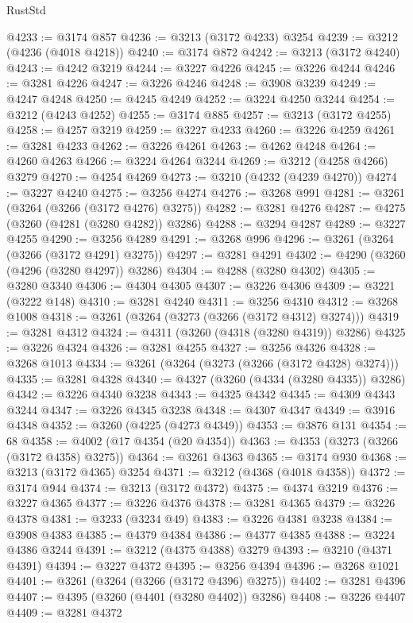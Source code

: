 \begin{lexlean}{RustStd}
\begin{coremodule}
{\begin{coremodule}
{{{{{{{{{{{{{{{{{{{{{{{{{{@4233 := @3174 @857
@4236 := @3213 (@3172 @4233) @3254
@4239 := @3212 (@4236 (@4018 @4218))
@4240 := @3174 @872
@4242 := @3213 (@3172 @4240)
@4243 := @4242 @3219
@4244 := @3227 @4226
@4245 := @3226 @4244
@4246 := @3281 @4226
@4247 := @3226 @4246
@4248 := @3908 @3239
@4249 := @4247 @4248
@4250 := @4245 @4249
@4252 := @3224 @4250 @3244
@4254 := @3212 (@4243 @4252)
@4255 := @3174 @885
@4257 := @3213 (@3172 @4255)
@4258 := @4257 @3219
@4259 := @3227 @4233
@4260 := @3226 @4259
@4261 := @3281 @4233
@4262 := @3226 @4261
@4263 := @4262 @4248
@4264 := @4260 @4263
@4266 := @3224 @4264 @3244
@4269 := @3212 (@4258 @4266) @3279
@4270 := @4254 @4269
@4273 := @3210 (@4232 (@4239 @4270))
@4274 := @3227 @4240
@4275 := @3256 @4274
@4276 := @3268 @991
@4281 := @3261 (@3264 (@3266 (@3172 @4276) @3275))
@4282 := @3281 @4276
@4287 := @4275 (@3260 (@4281 (@3280 @4282)) @3286)
@4288 := @3294 @4287
@4289 := @3227 @4255
@4290 := @3256 @4289
@4291 := @3268 @996
@4296 := @3261 (@3264 (@3266 (@3172 @4291) @3275))
@4297 := @3281 @4291
@4302 := @4290 (@3260 (@4296 (@3280 @4297)) @3286)
@4304 := @4288 (@3280 @4302)
@4305 := @3280 @3340
@4306 := @4304 @4305
@4307 := @3226 @4306
@4309 := @3221 (@3222 @148)
@4310 := @3281 @4240
@4311 := @3256 @4310
@4312 := @3268 @1008
@4318 := @3261 (@3264 (@3273 (@3266 (@3172 @4312) @3274)))
@4319 := @3281 @4312
@4324 := @4311 (@3260 (@4318 (@3280 @4319)) @3286)
@4325 := @3226 @4324
@4326 := @3281 @4255
@4327 := @3256 @4326
@4328 := @3268 @1013
@4334 := @3261 (@3264 (@3273 (@3266 (@3172 @4328) @3274)))
@4335 := @3281 @4328
@4340 := @4327 (@3260 (@4334 (@3280 @4335)) @3286)
@4342 := @3226 @4340 @3238
@4343 := @4325 @4342
@4345 := @4309 @4343 @3244
@4347 := @3226 @4345 @3238
@4348 := @4307 @4347
@4349 := @3916 @4348
@4352 := @3260 (@4225 (@4273 @4349))
@4353 := @3876 @131
@4354 := 68
@4358 := @4002 (@17 @4354 (@20 @4354))
@4363 := @4353 (@3273 (@3266 (@3172 @4358) @3275))
@4364 := @3261 @4363
@4365 := @3174 @930
@4368 := @3213 (@3172 @4365) @3254
@4371 := @3212 (@4368 (@4018 @4358))
@4372 := @3174 @944
@4374 := @3213 (@3172 @4372)
@4375 := @4374 @3219
@4376 := @3227 @4365
@4377 := @3226 @4376
@4378 := @3281 @4365
@4379 := @3226 @4378
@4381 := @3233 (@3234 @49)
@4383 := @3226 @4381 @3238
@4384 := @3908 @4383
@4385 := @4379 @4384
@4386 := @4377 @4385
@4388 := @3224 @4386 @3244
@4391 := @3212 (@4375 @4388) @3279
@4393 := @3210 (@4371 @4391)
@4394 := @3227 @4372
@4395 := @3256 @4394
@4396 := @3268 @1021
@4401 := @3261 (@3264 (@3266 (@3172 @4396) @3275))
@4402 := @3281 @4396
@4407 := @4395 (@3260 (@4401 (@3280 @4402)) @3286)
@4408 := @3226 @4407
@4409 := @3281 @4372
}}}}}}}}}}}}}}}}}}}}}}}}}}
\end{coremodule}}
\end{coremodule}
\end{lexlean}

